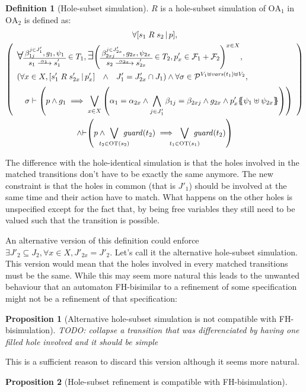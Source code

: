 \documentclass{article}
\theoremstyle{plain}
\newtheorem{prop}{Proposition}
\theoremstyle{definition}
\newtheorem{defi}{Definition}
\newcommand\nmm[1]{\(\displaystyle #1\)} %
\newcommand\mpar[1]{{\left(#1\right)}}
\newcommand\mbrk[1]{{\left[#1\right]}}
\newcommand\mbrc[1]{{\left\{#1\right\}}}
\newcommand\psubst[1]{\mbrc{\!\!\mbrc{#1}\!\!}}
\newcommand\midbar{\,\middle|\,}
\newcommand\prel[4]{\mbrk{#2\mathrel{#1}#3\midbar #4}}
\newcommand\subbox[1]{{\makebox[.5\width]{\(\scriptstyle #1\)}}}
\newcommand\bigsymb[2][\Large]{\text{#1\nmm{#2}}}
\newcommand\qwedge{\DOTSB\quad{\wedge}\quad}
\newcommand\sat{{\vdash}} %
\newcommand\fvars[1]{{\mathit{vars}\mpar{#1}}}
\newcommand\fformulae[1]{{\mathcal{F}}}
\newcommand\fvalues[1]{{\mathcal{P}}}
\newcommand\OT[6]{\text{\small\(%
	\setlength\arraycolsep{2pt}\everymath{\displaystyle}%
	\begin{array}{c}%
	#4,#5,#6 \\\hline
	#1\xrightarrow{\raisebox{-1.5pt}[.8\height][0pt]{\makebox[1.4\width]{\(\scriptstyle #3\)}}}#2
	\end{array}\)}}
\newcommand\OTx[4]{\OT{s_{#1}}{s'_{#1 #2}}{\alpha_{#1 #2}}{\beta_{#3 j}^{j \in J'_{#4}}}{g_{#1 #2}}{\psi_{#1 #2}}}
\begin{document}
\begin{defi}[Hole-subset simulation]
\(R\) is a hole-subset simulation of \(\mathrm{OA}_1\) in \(\mathrm{OA}_2\) is defined as:
\begin{multline*}
	\forall \prel{R}{s_1}{s_2}{p}, \\
	\mpar{\everymath{\displaystyle}\begin{array}{l}
		\bigsymb{\forall} \OTx{1}{}{1}{1} \in T_1, \bigsymb{\exists} \mpar{\OTx{2}{x}{2x}{2x} \in T_2, p'_x \in \fformulae{E}_1 + \fformulae{E}_2}^{x \in X}, \\[12pt]
		\mpar{\forall x \in X, \prel{R}{s'_1}{s'_{2x}}{p'_x} \qwedge J'_1 = J'_{2x} \cap J_1} \wedge \forall \sigma \in \fvalues{E_1}^{V_1 \uplus \fvars{t_1} \uplus V_2}, \\[6pt]
		\quad \sigma \vdash \mpar{p \wedge g_1 \implies \bigvee_{x \in X} \mpar{\alpha_1 = \alpha_{2x} \wedge \bigwedge_{j \in J'_1} \beta_{1j} = \beta_{2xj} \wedge g_{2x} \wedge p'_x\psubst{\psi_1 \uplus \psi_{2x}}}} \\[12pt]
	\end{array}} \\
	\wedge \sat\mpar{p \wedge \bigvee_\subbox{t_2 \in \mathrm{OT}\mpar{s_2}} \mathit{guard}\mpar{t_2} \implies \bigvee_\subbox{t_1 \in \mathrm{OT}\mpar{s_1}} \mathit{guard}\mpar{t_2}}
\end{multline*}
\end{defi}
The difference with the hole-identical simulation is that the holes involved in the matched transitions don't have to be exactly the same anymore.
The new constraint is that the holes in common (that is \(J'_1\)) should be involved at the same time and their action have to match.
What happens on the other holes is unspecified except for the fact that, by being free variables they still need to be valued such that the transition is possible.

An alternative version of this definition could enforce \(\exists J'_2 \subseteq J_2, \forall x \in X, J'_{2x} = J'_2\).
Let's call it the alternative hole-subset simulation.
This version would mean that the holes involved in every matched transitions must be the same.
While this may seem more natural this leads to the unwanted behaviour that an automaton FH-bisimilar to a refinement of some specification might not be a refinement of that specification:
\begin{prop}[Alternative hole-subset simulation is not compatible with FH-bisimulation]
TODO: collapse a transition that was differenciated by having one filled hole involved and it should be simple
\end{prop}
This is a sufficient reason to discard this version although it seems more natural.
\begin{prop}[Hole-subset refinement is compatible with FH-bisimulation]
\end{prop}
\end{document}
